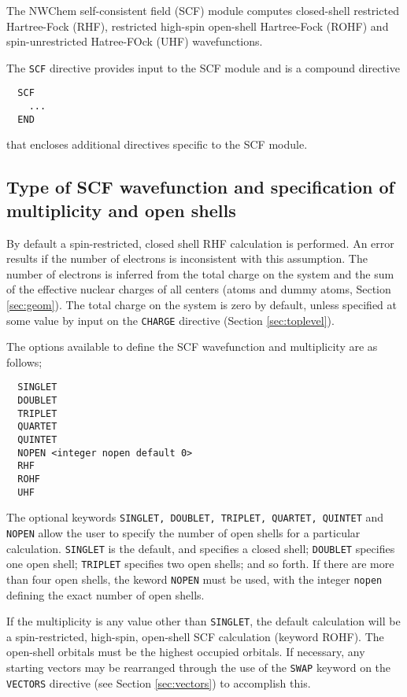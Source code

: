 \label{SCF} 

The NWChem self-consistent field (SCF) module computes closed-shell
restricted Hartree-Fock (RHF), restricted high-spin open-shell
Hartree-Fock (ROHF) and spin-unrestricted Hatree-FOck (UHF)
wavefunctions. 

The \verb+SCF+ directive provides input to the SCF module
and is a compound directive
\begin{verbatim}
  SCF
    ...
  END
\end{verbatim}
that encloses additional directives specific to the SCF module. 

\subsection{Type of SCF wavefunction and specification of multiplicity
and open shells}

By default a spin-restricted, closed shell RHF calculation is
performed.  An error results if the number of electrons is
inconsistent with this assumption.  The number of electrons is
inferred from the total charge on the system and the sum of the
effective nuclear charges of all centers (atoms and dummy atoms,
Section \ref{sec:geom}).  The total charge on the system is zero by
default, unless specified at some value by input on the \verb+CHARGE+
directive (Section \ref{sec:toplevel}).

The options available to define the SCF wavefunction and multiplicity
are as follows;

\begin{verbatim}
  SINGLET 
  DOUBLET 
  TRIPLET 
  QUARTET 
  QUINTET 
  NOPEN <integer nopen default 0>
  RHF
  ROHF
  UHF
\end{verbatim}

The optional keywords \verb+SINGLET, DOUBLET, TRIPLET, QUARTET, QUINTET+ 
and \verb+NOPEN+ allow the user to specify the number of open shells for a 
particular calculation.  \verb+SINGLET+ is the default, and specifies a 
closed shell; \verb+DOUBLET+ specifies one open shell; \verb+TRIPLET+
specifies two open shells; and so forth.  If there are more than four
open shells, the keword \verb+NOPEN+ must be used, with the integer
\verb+nopen+ defining the exact number of open shells.

If the multiplicity is any value other than \verb+SINGLET+, the
default calculation will be a spin-restricted, high-spin, open-shell
SCF calculation (keyword ROHF).  The open-shell orbitals must be the
highest occupied orbitals.  If necessary, any starting vectors may be
rearranged through the use of the \verb+SWAP+ keyword on the
\verb+VECTORS+ directive (see Section \ref{sec:vectors}) to accomplish
this.

